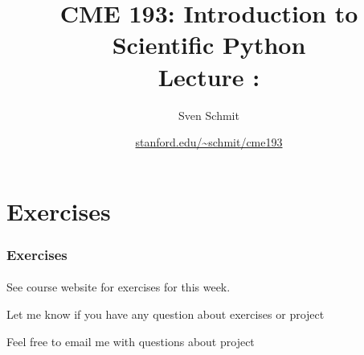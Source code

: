 \documentclass[
    smaller,
]{beamer}
\title{CME 193: Introduction to Scientific Python \\
Lecture \lecturenr: \lecturetitle}
\author{Sven Schmit}
\date{\url{stanford.edu/~schmit/cme193}}
\begin{document}
\maketitle

% 
% 
% 
% 

% 
% 
% 

% 
% 
% 
% 
% 

% 
% 

% 
% 
% 
% 



% 
% 





% 

\section{Exercises}

\begin{frame}\frametitle{Exercises}
    \framesubtitle{}

    See course website for exercises for this week.

    \vfill

    Let me know if you have any question about exercises or project

    \vfill

    Feel free to email me with questions about project

\end{frame}
\end{document}
